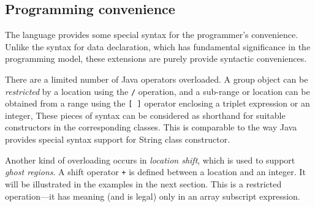 \subsection{Programming convenience}

The language provides some special syntax for the programmer's
convenience.  Unlike the syntax for data declaration, which has
fundamental significance in the programming model, these extensions are
purely provide syntactic conveniences.

There are a limited number of Java operators overloaded.  A group
object can be {\em restricted} by a location using the \texttt{/}
operation, and a sub-range or location can be obtained from a range
using the \texttt{[~]} operator enclosing a triplet expression or an
integer, These pieces of syntax can be considered as shorthand for
suitable constructors in the corresponding classes.  This is comparable
to the way Java provides special syntax support for String class
constructor.

Another kind of overloading occurs in \emph{location shift}, which is
used to support \emph{ghost regions}.  A shift operator \texttt{+} is
defined between a location and an integer.  It will be illustrated in
the examples in the next section.  This is a restricted operation---it
has meaning (and is legal) only in an array subscript expression.

